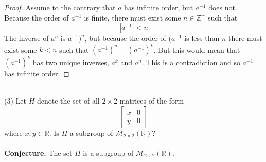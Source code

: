 \documentclass[11pt,a4paper]{article}
\begin{document}
\begin{proof}
Assume to the contrary that $a$ has infinite order, but $a^{-1}$ does not. Because the order of $a^{-1}$ is finite, there must exist some $n\in\mathbb{Z}^+$ such that
\begin{equation}\label{f1}
|a^{-1}| < n
\end{equation}
The inverse of $a^n$ is $a^{-1})^n$, but because the order of $(a^{-1}$ is less than $n$ there must exist some $k<n$ such that $(a^{-1})^n=(a^{-1})^k$. But this would mean that $(a^{-1})^k$ has two unique inverses, $a^k$ and $a^n$. This is a contradiction and so $a^{-1}$ has infinite order.
\end{proof}
~\\
(3) Let $H$ denote the set of all $2 \times 2$ matrices of the form
\[\begin{bmatrix}
x&0\\
y&0
\end{bmatrix}\]
where $x,y\in\mathbb{R}$. Is $H$ a subgroup of $\mathcal{M}_{2\times 2}(\mathbb{R})$?\\
~\\
{\bf Conjecture.} The set $H$ is a subgroup of $\mathcal{M}_{2\times 2}(\mathbb{R})$.
\end{document}
